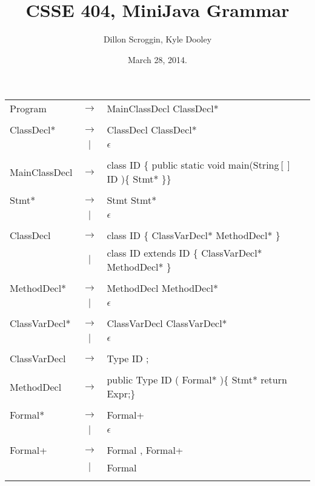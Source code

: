 \documentclass{article}
\author{Dillon Scroggin, Kyle Dooley}
\title{CSSE 404, MiniJava Grammar}
\date{March 28, 2014.}
\begin{document}
\maketitle

\begin{tabular}{ l c l }
	Program & $\rightarrow$ & MainClassDecl ClassDecl* \\
	\\

	ClassDecl* & $\rightarrow$ & ClassDecl ClassDecl* \\
	& $|$ & $\epsilon$\\
	\\

	MainClassDecl & $\rightarrow$ & class ID \{ public static void
main(String$[]$ ID )\{ Stmt* \}\} \\
	\\

	Stmt* & $\rightarrow$ & Stmt Stmt* \\
	&$|$&$\epsilon$ \\
	\\

	ClassDecl & $\rightarrow$ & class ID \{ ClassVarDecl* MethodDecl* \} \\
	& $|$ & class ID extends ID \{ ClassVarDecl* MethodDecl* \} \\
	\\

	MethodDecl* & $\rightarrow$ & MethodDecl MethodDecl* \\
	&$|$&$\epsilon$ \\
	\\
	
	ClassVarDecl* & $\rightarrow$ & ClassVarDecl ClassVarDecl* \\
	&$|$&$\epsilon$ \\
	\\

	ClassVarDecl & $\rightarrow$ & Type ID ; \\
	\\

	MethodDecl & $\rightarrow$ & public Type ID ( Formal* )\{ Stmt* return Expr;\} \\ 
	\\

	Formal* & $\rightarrow$ & Formal+ \\
	& $|$ & $\epsilon$ \\
	\\

	Formal+ & $\rightarrow$ & Formal , Formal+ \\
  	& $|$ & Formal \\
	\\


\end{tabular}
\end{document}
